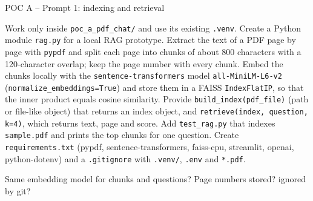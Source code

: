 \documentclass[aspectratio=169,11pt]{beamer}
\newcommand{\file}[1]{\leavevmode{\ttfamily\color{accent}#1}}
\begin{document}
\begin{frame}{POC A -- Prompt 1: indexing and retrieval}
  \begin{promptbox}
    \raggedright Work only inside \texttt{poc\_a\_pdf\_chat/} and use its existing \texttt{.venv}. Create a Python module \texttt{rag.py} for a local RAG prototype. Extract the text of a PDF page by page with \texttt{pypdf} and split each page into chunks of about 800 characters with a 120-character overlap; keep the page number with every chunk. Embed the chunks locally with the \texttt{sentence-transformers} model \texttt{all-MiniLM-L6-v2} (\texttt{normalize\_embeddings=True}) and store them in a FAISS \texttt{IndexFlatIP}, so that the inner product equals cosine similarity. Provide \texttt{build\_index(pdf\_file)} (path or file-like object) that returns an index object, and \mbox{\texttt{retrieve(index, question, k=4)}}, which returns text, page and score. Add \texttt{test\_rag.py} that indexes \texttt{sample.pdf} and prints the top chunks for one question. Create \texttt{requirements.txt} (pypdf, sentence-transformers, faiss-cpu, streamlit, openai, python-dotenv) and a \texttt{.gitignore} with \texttt{.venv/}, \texttt{.env} and \texttt{*.pdf}.
  \end{promptbox}
  \vspace{4pt}
  \begin{infobox}
    \footnotesize Same embedding model for chunks and questions? Page numbers stored? \file{.env} ignored by git?
  \end{infobox}
\end{frame}
\end{document}

